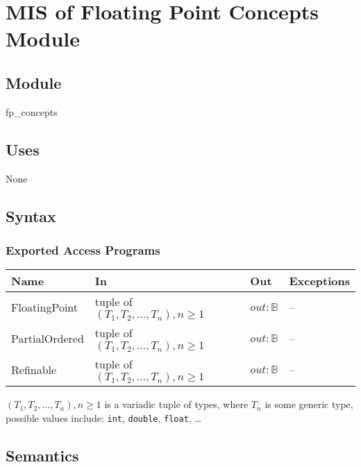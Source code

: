 \documentclass[12pt, titlepage]{article}
\begin{document}
\newpage

\section{MIS of Floating Point Concepts Module} \label{M:concepts}

\subsection{Module}

fp\_concepts

\subsection{Uses}

None

\subsection{Syntax}

\subsubsection{Exported Access Programs}

\begin{center}
  \begin{tabularx}{\linewidth}{%
    p{3cm}
    >{\raggedright\arraybackslash}X
    >{\raggedright\arraybackslash}l
    >{\raggedright\arraybackslash}l
    }
    \hline
    \textbf{Name}        & \textbf{In}                               & \textbf{Out}      & \textbf{Exceptions} \\
    \hline
    FloatingPoint  & tuple of \((T_1, T_2, \dots, T_n), n \geq 1\) & \(out: \mathbb{B}\) & --            \\
    PartialOrdered & tuple of \((T_1, T_2, \dots, T_n), n \geq 1\) & \(out: \mathbb{B}\) & --            \\
    Refinable      & tuple of \((T_1, T_2, \dots, T_n), n \geq 1\) & \(out: \mathbb{B}\) & --            \\
    \hline
  \end{tabularx}
\end{center}

\((T_1, T_2, \dots, T_n), n \geq 1\) is a variadic tuple of types, where \(T_n\) is some
generic type, possible values include: \texttt{int}, \texttt{double}, \texttt{float}, \dots

\subsection{Semantics}
\end{document}
